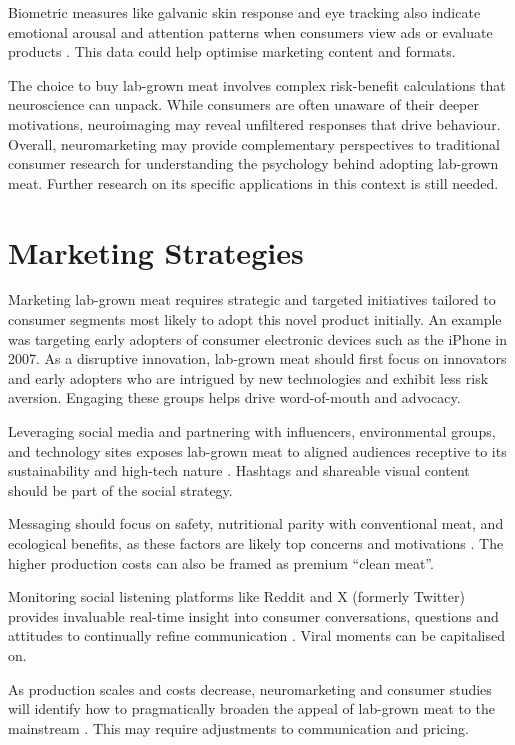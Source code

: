 \documentclass[10pt]{article}
\begin{document}
\begin{sloppypar}
  Biometric measures like galvanic skin response and eye tracking also indicate emotional arousal and attention patterns when consumers view ads or evaluate products \citep{riedl_decade_2020}. This data could help optimise marketing content and formats.

  The choice to buy lab-grown meat involves complex risk-benefit calculations that neuroscience can unpack. While consumers are often unaware of their deeper motivations, neuroimaging may reveal unfiltered responses that drive behaviour. Overall, neuromarketing may provide complementary perspectives to traditional consumer research for understanding the psychology behind adopting lab-grown meat. Further research on its specific applications in this context is still needed.

  \section{Marketing Strategies}
  \label{sec:marketing-strategies}

  Marketing lab-grown meat requires strategic and targeted initiatives tailored to consumer segments most likely to adopt this novel product initially. An example was targeting early adopters of consumer electronic devices such as the iPhone in 2007. As a disruptive innovation, lab-grown meat should first focus on innovators and early adopters who are intrigued by new technologies and exhibit less risk aversion. Engaging these groups helps drive word-of-mouth and advocacy.

  Leveraging social media and partnering with influencers, environmental groups, and technology sites exposes lab-grown meat to aligned audiences receptive to its sustainability and high-tech nature \citep{goodwin_future_2013}. Hashtags and shareable visual content should be part of the social strategy.

  Messaging should focus on safety, nutritional parity with conventional meat, and ecological benefits, as these factors are likely top concerns and motivations \citep{circus_exploring_2018}. The higher production costs can also be framed as premium “clean meat”.

  Monitoring social listening platforms like Reddit and X (formerly Twitter) provides invaluable real-time insight into consumer conversations, questions and attitudes to continually refine communication \citep{verbeke_would_2015}. Viral moments can be capitalised on.

  As production scales and costs decrease, neuromarketing and consumer studies will identify how to pragmatically broaden the appeal of lab-grown meat to the mainstream \citep{verbeke_would_2015}. This may require adjustments to communication and pricing.


\end{sloppypar}
\end{document}
